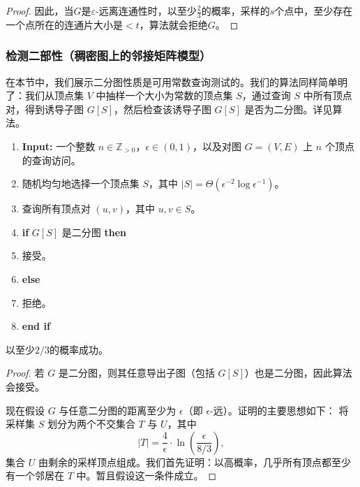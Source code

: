 \documentclass[lang=cn,newtx,10pt,scheme=chinese,chinesefont=nofont,citestyle=gb7714-2015, bibstyle=gb7714-2015]{elegantbook}
\begin{document}
\begin{refsection}
\begin{proof}
    因此，当$G$是$\varepsilon$-远离连通性时，以至少$\frac{2}{3}$的概率，采样的$s$个点中，至少存在一个点所在的连通片大小是$<t$，算法就会拒绝$G$。
\end{proof}

\subsubsection{检测二部性（稠密图上的邻接矩阵模型）}

在本节中，我们展示二分图性质是可用常数查询测试的。我们的算法同样简单明了：我们从顶点集 $ V $ 中抽样一个大小为常数的顶点集 $ S $，通过查询 $ S $ 中所有顶点对，得到诱导子图 $ G[S] $，然后检查该诱导子图 $ G[S] $ 是否为二分图。详见算法。
\begin{algorithm}[ht]
	\caption{\textbf{二部性检测算法}}
	\label{alg-gilbert}
	\begin{enumerate}
    \item \textbf{Input:} 一个整数 $ n \in \mathbb{Z}_{>0} $，$ \epsilon \in (0, 1) $，以及对图 $ G = (V, E) $ 上 $ n $ 个顶点的查询访问。
    \item 随机均匀地选择一个顶点集 $ S $，其中 $ |S| = \Theta(\epsilon^{-2} \log \epsilon^{-1}) $。
    \item 查询所有顶点对 $ (u, v) $，其中 $ u, v \in S $。
    \item \textbf{if} $ G[S] $ 是二分图 \textbf{then}
    \item \hspace{1em} 接受。
    \item \textbf{else}
    \item \hspace{1em} 拒绝。
    \item \textbf{end if}
\end{enumerate}
\end{algorithm}

\begin{theorem}
以至少$2/3$的概率成功。
\end{theorem}
\begin{proof}
若 $G$ 是二分图，则其任意导出子图（包括 $G[S]$）也是二分图，因此算法会接受。

现在假设 $G$ 与任意二分图的距离至少为 $\epsilon$（即 $\epsilon$-远）。证明的主要思想如下：  
将采样集 $S$ 划分为两个不交集合 $T$ 与 $U$，其中  
$$
|T| = \frac{4}{\epsilon} \cdot \ln\!\left( \frac{\epsilon}{8/3} \right),
$$
集合 $U$ 由剩余的采样顶点组成。我们首先证明：以高概率，几乎所有顶点都至少有一个邻居在 $T$ 中。暂且假设这一条件成立。


\end{proof}
\end{refsection}
\end{document}
